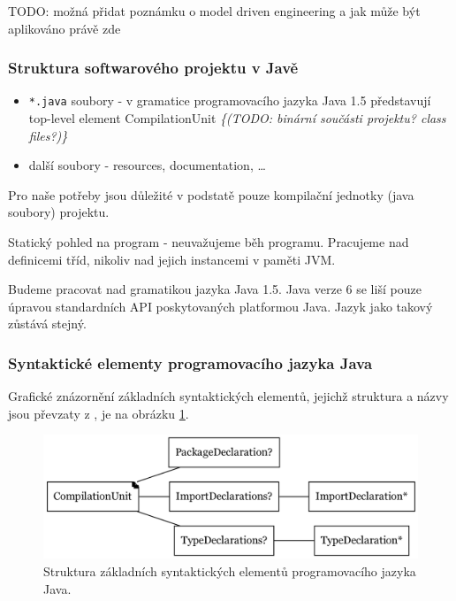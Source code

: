 TODO: možná přidat poznámku o model driven engineering a jak může být aplikováno právě zde

\subsubsection{Struktura softwarového projektu v Javě}

\begin{itemize}
\item\verb+*.java+ soubory - v gramatice programovacího jazyka Java 1.5 představují top-level element CompilationUnit \emph{\{(TODO: binární součásti projektu? class files?)\}}
\item další soubory - resources, documentation, \ldots
\end{itemize}

Pro naše potřeby jsou důležité v podstatě pouze kompilační jednotky (java soubory) projektu.

Statický pohled na program - neuvažujeme běh programu. Pracujeme nad definicemi tříd, nikoliv nad jejich instancemi v paměti JVM.

Budeme pracovat nad gramatikou jazyka Java 1.5. Java verze 6 se liší pouze úpravou standardních API poskytovaných platformou Java. Jazyk jako takový zůstává stejný.

\subsubsection{Syntaktické elementy programovacího jazyka Java}
Grafické znázornění základních syntaktických elementů, jejichž struktura a názvy jsou převzaty z \cite{Gosling:2005:JLS:1036643}, je na obrázku \ref{toplevel_elements}.
\begin{figure}[h!]
  \centering
  \includegraphics[width=\textwidth]{./graphs/java_top_elements.png}
  \caption{Struktura základních syntaktických elementů programovacího jazyka Java.\label{toplevel_elements}}
\end{figure}

